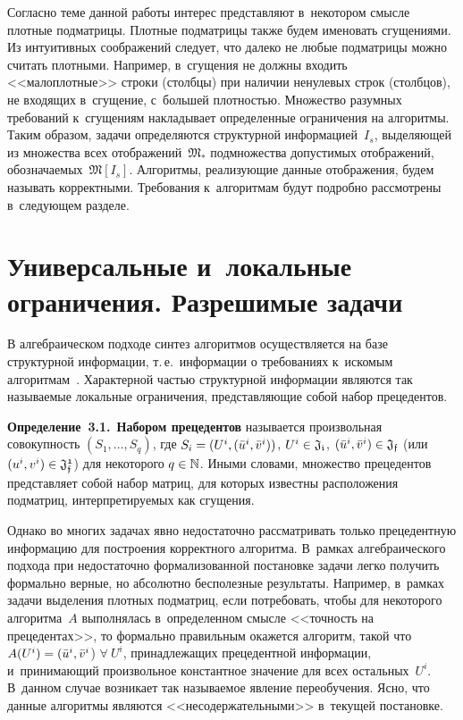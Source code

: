 \begin{multicols}{2}
Согласно теме данной работы интерес пред\-став\-ля\-ют в~некотором смысле плотные 
подматрицы. Плотные подматрицы также будем именовать сгущениями. Из интуитивных 
соображений следует, что далеко не любые подматрицы можно считать плотными.
Например, в~сгущения не должны входить <<малоплотные>> строки (столбцы) при 
наличии ненулевых строк (столбцов), не входящих в~сгущение, с~большей 
плотностью. Множество разумных требований к~сгущениям накладывает определенные 
ограничения на алгоритмы.
Таким образом, задачи определяются структурной информацией~$I_s$, выделяющей из 
множества всех отображений~$\mathfrak{M_*}$ подмножества допустимых отображений, 
обозначаемых~$\mathfrak{M}[I_s]$. Алгоритмы, реализующие данные отображения, 
будем называть корректными. Требования к~алгоритмам будут подробно рассмотрены 
в~следующем разделе.

\section{Универсальные и~локальные ограничения. Разрешимые  задачи}

В алгебраическом подходе синтез алгоритмов осуществляется на базе структурной 
информации, т.\,е.\ информации о требованиях к~искомым 
алгоритмам~\cite{Rudakov1,Rudakov2,Rudakov3,Rudakov4,Rudakov5}. Характерной частью 
структурной информации являются так называемые локальные ограничения, 
представляющие собой набор прецедентов.

\smallskip

\noindent
\textbf{Определение~3.1.}\ \textbf{Набором прецедентов}
называется произвольная совокупность $(S_1,\ldots,S_q)$, где $S_i \hm= (U^i , 
(\bar u^i, \bar v^i))$, $U^i \hm\in \mathfrak{J_i}$, $(\bar u^i, \bar v^i) \hm\in 
\mathfrak{J_f}$ (или $(u^i, v^i) \hm\in \mathfrak{J_f^1}$)   для некоторого $q \hm\in 
\mathbb{N}$.
Иными словами, множество прецедентов представляет собой набор матриц, для 
которых известны расположения подматриц, интерпретируемых как сгущения.

\smallskip

Однако во многих задачах явно недостаточно рассматривать только прецедентную 
информацию для построения корректного алгоритма.
В~рамках алгебраического подхода при недостаточно формализованной постановке 
задачи легко получить формально верные, но абсолютно бесполезные результаты.
Например, в~рамках задачи выделения плотных подматриц, если потребовать, чтобы 
для некоторого алгоритма~$A$ выполнялась в~определенном смысле <<точность на 
прецедентах>>, то формально правильным окажется алгоритм, такой что $A(U^i) \hm= 
(\bar u^i, \bar v^i$) $\forall\ U^i$,
 принадлежащих прецедентной информации, и~принимающий произвольное константное 
значение для всех остальных~$U^i$. В~данном случае возникает так называемое 
явление переобучения. Ясно, что данные алгоритмы являются <<несодержательными>> в~текущей постановке.


\end{multicols}
